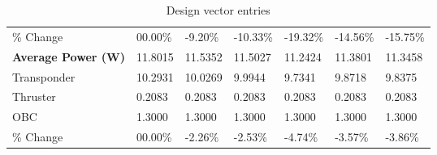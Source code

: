 \begin{table}[H]
\begin{tabular}{lllllll}
\% Change & 00.00\% &-9.20\% & -10.33\% & -19.32\% & -14.56\% & -15.75\% \\
\rowcolor[HTML]{EFEFEF} 
\cellcolor[HTML]{EFEFEF}\textbf{Average Power (W)} & \cellcolor[HTML]{EFEFEF}11.8015 & 11.5352 & 11.5027 & 11.2424 & 11.3801 & 11.3458 \\
Transponder & 10.2931 & 10.0269 & 9.9944 & 9.7341 & 9.8718 & 9.8375 \\
Thruster & 0.2083 & 0.2083 & 0.2083 & 0.2083 & 0.2083 & 0.2083 \\
OBC & 1.3000 & 1.3000 & 1.3000 & 1.3000 & 1.3000 & 1.3000 \\
\% Change & 00.00\% &-2.26\% & -2.53\% & -4.74\% & -3.57\% & -3.86\% \\
\end{tabular}
\caption{Design vector entries}
\label{tab:DesignVectorEntries_default56dur1len3int}
\end{table}